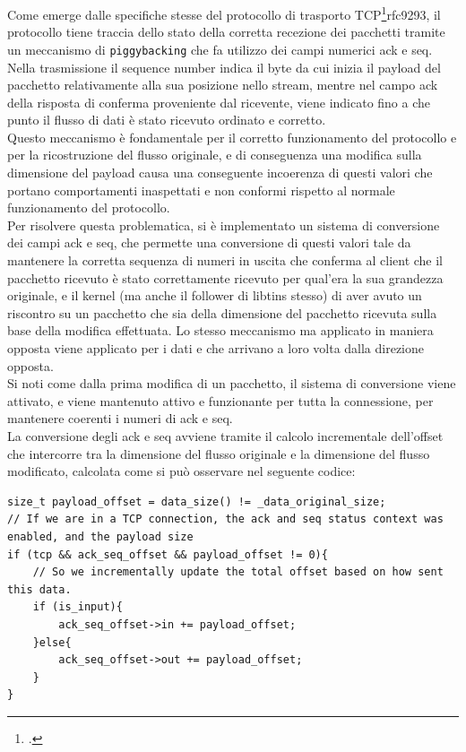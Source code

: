 Come emerge dalle specifiche stesse del protocollo di trasporto TCP\footcite{RFC9293, Transmission Control Protocol (TCP)}{rfc9293}, il protocollo tiene traccia
dello stato della corretta recezione dei pacchetti tramite un meccanismo di \texttt{piggybacking} che fa utilizzo dei campi numerici ack e seq.
Nella trasmissione il sequence number indica il byte da cui inizia il payload del pacchetto relativamente alla sua posizione nello stream, mentre nel campo ack della risposta
di conferma proveniente dal ricevente, viene indicato fino a che punto il flusso di dati è stato ricevuto ordinato e corretto.\\
Questo meccanismo è fondamentale per il corretto funzionamento del protocollo e per la ricostruzione del flusso originale,
e di conseguenza una modifica sulla dimensione del payload causa una conseguente incoerenza di questi valori che portano comportamenti inaspettati e non conformi rispetto al 
normale funzionamento del protocollo.\\

Per risolvere questa problematica, si è implementato un sistema di conversione dei campi ack e seq, che permette una conversione di questi valori tale da
mantenere la corretta sequenza di numeri in uscita che conferma al client che il pacchetto ricevuto è stato correttamente ricevuto per qual'era la sua grandezza originale,
e il kernel (ma anche il follower di libtins stesso) di aver avuto un riscontro su un pacchetto che sia della dimensione del pacchetto ricevuta sulla base della modifica effettuata.
Lo stesso meccanismo ma applicato in maniera opposta viene applicato per i dati e che arrivano a loro volta dalla direzione opposta.\\
Si noti come dalla prima modifica di un pacchetto, il sistema di conversione viene attivato, e viene mantenuto attivo e funzionante per tutta la connessione, per
mantenere coerenti i numeri di ack e seq.\\

La conversione degli ack e seq avviene tramite il calcolo incrementale dell'offset che intercorre tra la dimensione del flusso originale e la dimensione del flusso modificato,
calcolata come si può osservare nel seguente codice:

\begin{listing}[H]
    \begin{verbatim}
size_t payload_offset = data_size() != _data_original_size;
// If we are in a TCP connection, the ack and seq status context was enabled, and the payload size 
if (tcp && ack_seq_offset && payload_offset != 0){
    // So we incrementally update the total offset based on how sent this data.
    if (is_input){
        ack_seq_offset->in += payload_offset;
    }else{
        ack_seq_offset->out += payload_offset;
    }
}
\end{verbatim}
\end{listing}

